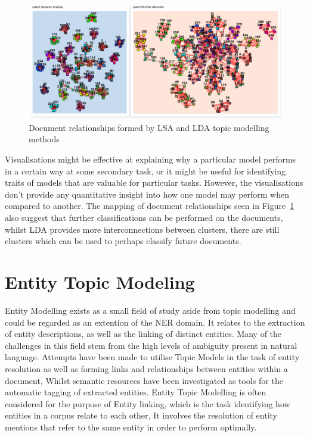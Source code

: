 \documentclass[10pt]{report}
\begin{document}
\begin{figure}[h!]
  \centering
  \includegraphics[scale=0.4]{lda_lsa_document_view}
  \caption{Document relationships formed by LSA and LDA topic modelling methods\label{fig:lsa_lda_compare}}
\end{figure}

Visualisations might be effective at explaining why a particular model performs in a certain way at some secondary task, or it might be useful for identifying traits of models that are valuable for particular tasks. However, the visualisations don't provide any quantitative insight into how one model may perform when compared to another. The mapping of document relationships seen in Figure~\ref{fig:lsa_lda_compare} also suggest that further classifications can be performed on the documents, whilst LDA provides more interconnections between clusters, there are still clusters which can be used to perhaps classify future documents.

\clearpage
\section{Entity Topic Modeling}
Entity Modelling exists as a small field of study aside from topic modelling and could be regarded as an extention of the NER domain. It relates to the extraction of entity descriptions, as well as the linking of distinct entities. Many of the challenges in this field stem from the high levels of ambiguity present in natural language. Attempts have been made to utilise Topic Models in the task of entity resolution as well as forming links and relationships between entities within a document, Whilst semantic resources have been investigated as tools for the automatic tagging of extracted entities. Entity Topic Modelling is often considered for the purpose of Entity linking, which is the task identifying how entities in a corpus relate to each other, It involves the resolution of entity mentions that refer to the same entity in order to perform optimally.
\end{document}
